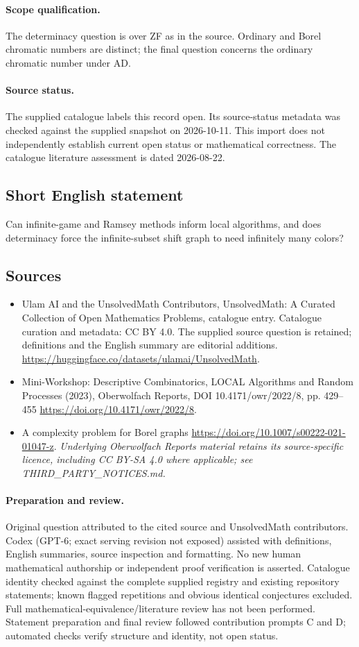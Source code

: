 \documentclass[11pt]{article}
\begin{document}
\paragraph{Scope qualification.}
The determinacy question is over ZF as in the source. Ordinary and Borel chromatic numbers are distinct; the final question concerns the ordinary chromatic number under AD.
\paragraph{Source status.}
The supplied catalogue labels this record open. Its source-status metadata was checked against the supplied snapshot on 2026-10-11. This import does not independently establish current open status or mathematical correctness. The catalogue literature assessment is dated 2026-08-22.
\subsection{Short English statement}
Can infinite-game and Ramsey methods inform local algorithms, and does determinacy force the infinite-subset shift graph to need infinitely many colors?
\subsection{Sources}
\begin{itemize}
\item[S1] Ulam AI and the UnsolvedMath Contributors, UnsolvedMath: A Curated Collection of Open Mathematics Problems, catalogue entry. Catalogue curation and metadata: CC BY 4.0. The supplied source question is retained; definitions and the English summary are editorial additions.
\url{https://huggingface.co/datasets/ulamai/UnsolvedMath}.
\item[S2] Mini-Workshop: Descriptive Combinatorics, LOCAL Algorithms and Random Processes (2023), Oberwolfach Reports, DOI 10.4171/owr/2022/8, pp. 429--455
\url{https://doi.org/10.4171/owr/2022/8}.
\item[S3] A complexity problem for Borel graphs
\url{https://doi.org/10.1007/s00222-021-01047-z}.
\textit{Underlying Oberwolfach Reports material retains its source-specific licence, including CC BY-SA 4.0 where applicable; see THIRD\_PARTY\_NOTICES.md.}
\end{itemize}
\paragraph{Preparation and review.}
Original question attributed to the cited source and UnsolvedMath contributors. Codex (GPT-6; exact serving revision not exposed) assisted with definitions, English summaries, source inspection and formatting. No new human mathematical authorship or independent proof verification is asserted. Catalogue identity checked against the complete supplied registry and existing repository statements; known flagged repetitions and obvious identical conjectures excluded. Full mathematical-equivalence/literature review has not been performed. Statement preparation and final review followed contribution prompts C and D; automated checks verify structure and identity, not open status.
\label{end:statement}
\end{document}
